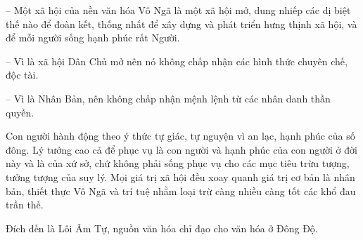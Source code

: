 -- Một xã hội của nền văn hóa Vô Ngã là một xã hội mở, dung nhiếp các dị biệt thế nào để đoàn kết, thống nhất để xây dựng và phát triển hưng thịnh xã hội, và để mỗi người sống hạnh phúc rất Người.

-- Vì là xã hội Dân Chủ mở nên nó không chấp nhận các hình thức chuyên chế, độc tài.

-- Vì là Nhân Bản, nên không chấp nhận mệnh lệnh từ các nhân danh thần quyền.

Con người hành động theo ý thức tự giác, tự nguyện vì an lạc, hạnh phúc của số đông. Lý tưởng cao cả để phục vụ là con người và hạnh phúc của con người ở đời này và là của xứ sở, chứ không phải sống phục vụ cho các mục tiêu trừu tượng, tưởng tượng của suy lý. Mọi giá trị xã hội đều xoay quanh giá trị cơ bản là nhân bản, thiết thực Vô Ngã và trí tuệ nhằm loại trừ càng nhiều càng tốt các khổ đau trần thế.

Đích đến là Lôi Âm Tự, nguồn văn hóa chỉ đạo cho văn hóa ở Đông Độ.
